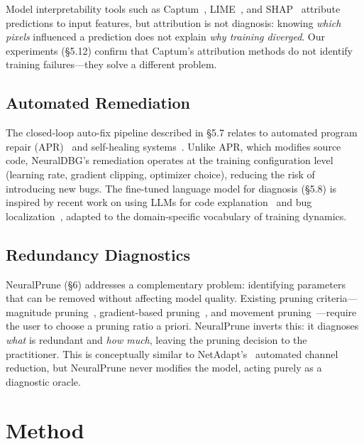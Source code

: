 \documentclass[11pt]{article}
\begin{document}
Model interpretability tools such as Captum~\cite{kokhlikyan2020captum}, LIME~\cite{ribeiro2016lime}, and SHAP~\cite{lundberg2017shap} attribute predictions to input features, but attribution is not diagnosis: knowing \emph{which pixels} influenced a prediction does not explain \emph{why training diverged}. Our experiments (\S5.12) confirm that Captum's attribution methods do not identify training failures—they solve a different problem.

\subsection{Automated Remediation}

The closed-loop auto-fix pipeline described in \S5.7 relates to automated program repair (APR)~\cite{legoues2019apr} and self-healing systems~\cite{kephart2003autonomic}. Unlike APR, which modifies source code, NeuralDBG's remediation operates at the training configuration level (learning rate, gradient clipping, optimizer choice), reducing the risk of introducing new bugs. The fine-tuned language model for diagnosis (\S5.8) is inspired by recent work on using LLMs for code explanation~\cite{chen2021codex} and bug localization~\cite{pearce2022codexbugs}, adapted to the domain-specific vocabulary of training dynamics.

\subsection{Redundancy Diagnostics}

NeuralPrune (\S6) addresses a complementary problem: identifying parameters that can be removed without affecting model quality. Existing pruning criteria—magnitude pruning~\cite{han2015learning}, gradient-based pruning~\cite{molchanov2017pruning}, and movement pruning~\cite{sanh2020movement}—require the user to choose a pruning ratio a priori. NeuralPrune inverts this: it diagnoses \emph{what} is redundant and \emph{how much}, leaving the pruning decision to the practitioner. This is conceptually similar to NetAdapt's~\cite{yang2018netadapt} automated channel reduction, but NeuralPrune never modifies the model, acting purely as a diagnostic oracle.

\section{Method}
\end{document}
